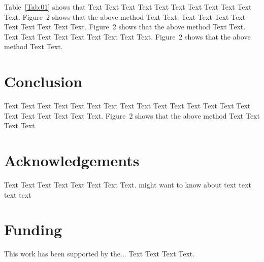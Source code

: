 \documentclass{bioinfo}
\begin{document}
Table~\ref{Tab:01} shows that Text Text Text Text Text  Text Text
Text Text Text Text. Figure~2\vphantom{\ref{fig:02}} shows that
the above method Text Text. Text Text Text  Text Text Text Text
Text Text. Figure~2\vphantom{\ref{fig:02}} shows that the above
method Text Text. Text Text Text  Text Text Text Text Text Text.
Figure~2\vphantom{\ref{fig:02}} shows that the above method Text
Text.









%
%






\section{Conclusion}

Text Text Text Text Text Text  Text Text Text Text Text Text Text
Text Text  Text Text Text Text Text Text.
Figure~2\vphantom{\ref{fig:02}} shows that the above method  Text
Text Text Text\vspace*{-10pt}


\section*{Acknowledgements}

Text Text Text Text Text Text  Text Text.  \citealp{Boffelli03} might want to know about  text
text text text\vspace*{-12pt}

\section*{Funding}

This work has been supported by the... Text Text  Text Text.\vspace*{-12pt}

%
%
%
%
%
%
%
%
%
\end{document}
